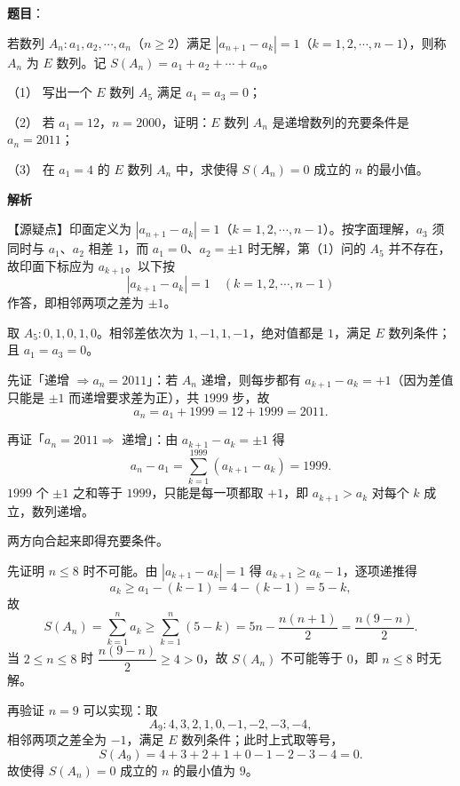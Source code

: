 \begin{answer}

\textbf{题目}：

若数列 $A_n:a_1,a_2,\cdots,a_n$（$n\geqslant 2$）满足 $|a_{n+1}-a_k|=1$（$k=1,2,\cdots,n-1$），则称 $A_n$ 为 $E$ 数列。记 $S(A_n)=a_1+a_2+\cdots+a_n$。

（1） 写出一个 $E$ 数列 $A_5$ 满足 $a_1=a_3=0$；

（2） 若 $a_1=12$，$n=2000$，证明：$E$ 数列 $A_n$ 是递增数列的充要条件是 $a_n=2011$；

（3） 在 $a_1=4$ 的 $E$ 数列 $A_n$ 中，求使得 $S(A_n)=0$ 成立的 $n$ 的最小值。

\textbf{解析}

【源疑点】印面定义为 $|a_{n+1}-a_k|=1$（$k=1,2,\cdots,n-1$）。按字面理解，$a_3$ 须同时与 $a_1$、$a_2$ 相差 $1$，而 $a_1=0$、$a_2=\pm1$ 时无解，第（1）问的 $A_5$ 并不存在，故印面下标应为 $a_{k+1}$。以下按
\nopagebreak[4]
\[
|a_{k+1}-a_k|=1\quad(k=1,2,\cdots,n-1)
\]
作答，即相邻两项之差为 $\pm1$。


取 $A_5:0,1,0,1,0$。相邻差依次为 $1,-1,1,-1$，绝对值都是 $1$，满足 $E$ 数列条件；且 $a_1=a_3=0$。


先证「递增 $\Rightarrow a_n=2011$」：若 $A_n$ 递增，则每步都有 $a_{k+1}-a_k=+1$（因为差值只能是 $\pm1$ 而递增要求差为正），共 $1999$ 步，故
\nopagebreak[4]
\[
a_n=a_1+1999=12+1999=2011.
\]

再证「$a_n=2011\Rightarrow$ 递增」：由 $a_{k+1}-a_k=\pm1$ 得
\nopagebreak[4]
\[
a_n-a_1=\sum_{k=1}^{1999}(a_{k+1}-a_k)=1999.
\]
$1999$ 个 $\pm1$ 之和等于 $1999$，只能是每一项都取 $+1$，即 $a_{k+1}>a_k$ 对每个 $k$ 成立，数列递增。

两方向合起来即得充要条件。


先证明 $n\leqslant8$ 时不可能。由 $|a_{k+1}-a_k|=1$ 得 $a_{k+1}\geqslant a_k-1$，逐项递推得
\nopagebreak[4]
\[
a_k\geqslant a_1-(k-1)=4-(k-1)=5-k,
\]
故
\nopagebreak[4]
\[
S(A_n)=\sum_{k=1}^{n}a_k\geqslant\sum_{k=1}^{n}(5-k)=5n-\frac{n(n+1)}{2}=\frac{n(9-n)}{2}.
\]
当 $2\leqslant n\leqslant8$ 时 $\dfrac{n(9-n)}{2}\geqslant4>0$，故 $S(A_n)$ 不可能等于 $0$，即 $n\leqslant8$ 时无解。

再验证 $n=9$ 可以实现：取
\nopagebreak[4]
\[
A_9:4,3,2,1,0,-1,-2,-3,-4,
\]
相邻两项之差全为 $-1$，满足 $E$ 数列条件；此时上式取等号，
\nopagebreak[4]
\[
S(A_9)=4+3+2+1+0-1-2-3-4=0.
\]
故使得 $S(A_n)=0$ 成立的 $n$ 的最小值为 $9$。




\end{answer}